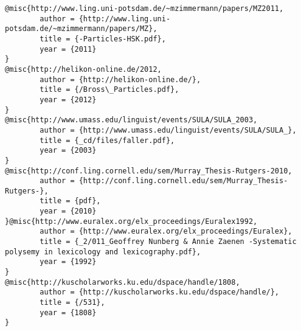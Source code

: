 \begin{verbatim}
@misc{http://www.ling.uni-potsdam.de/~mzimmermann/papers/MZ2011,
        author = {http://www.ling.uni-potsdam.de/~mzimmermann/papers/MZ},
        title = {-Particles-HSK.pdf},
        year = {2011}
}
@misc{http://helikon-online.de/2012,
        author = {http://helikon-online.de/},
        title = {/Bross\_Particles.pdf},
        year = {2012}
}
@misc{http://www.umass.edu/linguist/events/SULA/SULA_2003,
        author = {http://www.umass.edu/linguist/events/SULA/SULA_},
        title = {_cd/files/faller.pdf},
        year = {2003}
}
@misc{http://conf.ling.cornell.edu/sem/Murray_Thesis-Rutgers-2010,
        author = {http://conf.ling.cornell.edu/sem/Murray_Thesis-Rutgers-},
        title = {pdf},
        year = {2010}
}@misc{http://www.euralex.org/elx_proceedings/Euralex1992,
        author = {http://www.euralex.org/elx_proceedings/Euralex},
        title = {_2/011_Geoffrey Nunberg & Annie Zaenen -Systematic polysemy in lexicology and lexicography.pdf},
        year = {1992}
}
@misc{http://kuscholarworks.ku.edu/dspace/handle/1808,
        author = {http://kuscholarworks.ku.edu/dspace/handle/},
        title = {/531},
        year = {1808}
}
\end{verbatim}